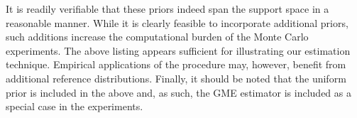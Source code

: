 \documentclass[english]{article}
\begin{document}
\noindent
It is readily verifiable that these priors indeed span the support space in
a reasonable manner.
While it is clearly feasible to incorporate additional priors, such additions 
increase the computational burden of the Monte Carlo experiments.
The above listing appears sufficient for illustrating our estimation technique.
Empirical applications of the procedure may, however, benefit from 
additional reference distributions.
Finally, it should be noted that the uniform prior is included in the above 
and, as such, the GME estimator is included as a special case in the 
experiments. 


\newpage
\cleardoublepage
\singlespacing




\newpage
\end{document}
